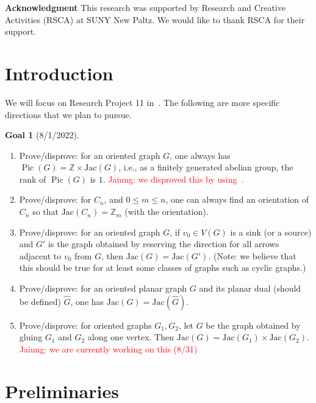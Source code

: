 \documentclass[11pt,reqno]{amsart}
\DeclareMathOperator{\Pic}{Pic}
\newcommand{\Jac}{\textrm{Jac}}{}
\theoremstyle{definition}
\newtheorem*{goal}{\textbf{Goal}}
\theoremstyle{plain}
\begin{document}
\vspace*{\fill}

\textbf{Acknowledgment}\hspace{0.1cm} This research was supported by Research and Creative Activities (RSCA) at
SUNY New Paltz. We would like to thank RSCA for their support.

\pagebreak

\section{Introduction}

	We will focus on Research Project 11 in~\cite{glass2020chip}.
	The following are more specific directions that we plan to pursue.

	\begin{goal}[8/1/2022]$ $
		\begin{enumerate}
			\item
			Prove/disprove: for an oriented graph $G$, one always has $\Pic(G)=\mathbb{Z} \times \Jac(G)$, 
			i.e., as a finitely generated abelian group, the rank of $\Pic(G)$ is $1$.
			\textcolor{red}{Jaiung: we disproved this by using~\cite{wagner2000critical}.}
			\item
			Prove/disprove: for $C_n$, and $0 \leq m \leq n$, one can always find an orientation
			of $C_n$ so that $\Jac(C_n)=\mathbb{Z}_m$ (with the orientation).
			\item
			Prove/disprove: for an oriented graph $G$, if $v_0 \in V(G)$ is a sink (or a source)
			and $G'$ is the graph obtained by reserving the direction for all arrows adjacent
			to $v_0$ from $G$, then $\Jac(G)=\Jac(G')$. (Note: we believe that this should be true
			for at least some classes of graphs such as cyclic graphs.)
			\item
			Prove/disprove: for an oriented planar graph $G$ and its planar dual (should be defined)
			$\hat{G}$, one has $\Jac(G)=\Jac(\hat{G})$.
			\item
			Prove/disprove: for oriented graphs $G_1,G_2$, let $G$ be the graph obtained by
			gluing $G_1$ and $G_2$ along one vertex. Then $\Jac(G)=\Jac(G_1) \times \Jac(G_2)$.
			\textcolor{red}{Jaiung: we are currently working on this (8/31)}
		\end{enumerate}
	\end{goal}

\bigskip

\section{Preliminaries}
\end{document}

